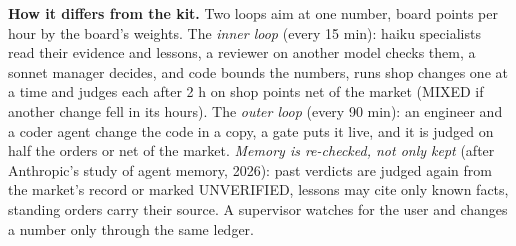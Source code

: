 \documentclass[11pt]{article}
\begin{document}
\vspace{1mm}
\begin{minipage}{0.98\linewidth}\scriptsize
\textbf{How it differs from the kit.} Two loops aim at one number, board points per hour by the board's weights. The \emph{inner loop} (every 15 min): haiku specialists read their evidence and lessons, a reviewer on another model checks them, a sonnet manager decides, and code bounds the numbers, runs shop changes one at a time and judges each after 2 h on shop points net of the market (MIXED if another change fell in its hours). The \emph{outer loop} (every 90 min): an engineer and a coder agent change the code in a copy, a gate puts it live, and it is judged on half the orders or net of the market. \emph{Memory is re-checked, not only kept} (after Anthropic's study of agent memory, 2026): past verdicts are judged again from the market's record or marked UNVERIFIED, lessons may cite only known facts, standing orders carry their source. A supervisor watches for the user and changes a number only through the same ledger.
\end{minipage}
\end{document}
